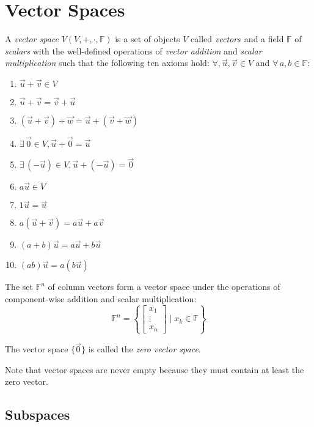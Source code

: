 \documentclass[letterpaper,12pt,fleqn]{article}
\newcommand{\vu}{\vec{u}}
\newcommand{\vv}{\vec{v}}
\newcommand{\vw}{\vec{w}}
\newcommand{\vz}{\vec{0}}
\newcommand{\F}{\mathbb{F}}
\begin{document}
\section*{Vector Spaces}

\begin{definition}
  A \emph{vector space} $V(V,+,\cdot,\F)$ is a set of objects $V$ called
  $\emph{vectors}$ and a field $\F$ of \emph{scalars} with the well-defined operations of
  \emph{vector addition} and \emph{scalar multiplication} such that the following ten
  axioms hold:
  $\forall,\vu,\vv\in V$ and $\forall\,a,b\in\F$:
  \begin{enumerate}
  \item $\vu+\vv\in V$
  \item $\vu+\vv=\vv+\vu$
  \item $(\vu+\vv)+\vw=\vu+(\vv+\vw)$
  \item $\exists\,\vz\in V,\vu+\vz=\vu$
  \item $\exists\,(-\vu)\in V,\vu+(-\vu)=\vz$
  \item $a\vu\in V$
  \item $1\vu=\vu$
  \item $a(\vu+\vv)=a\vu+a\vv$
  \item $(a+b)\vu=a\vu+b\vu$
  \item $(ab)\vu=a(b\vu)$
  \end{enumerate}
\end{definition}

\begin{example}
  The set $\F^n$ of column vectors form a vector space under the operations of
  component-wise addition and scalar multiplication:
  \[\F^n=\left\{\begin{bmatrix} x_1 \\ \vdots \\ x_n \end{bmatrix}\mid x_k\in\F\right\}\]
\end{example}

\begin{definition}
  The vector space $\{\vz\}$ is called the \emph{zero vector space}.
\end{definition}

Note that vector spaces are never empty because they must contain at least the zero
vector.

\newpage

\subsection*{Subspaces}
  
\end{document}
